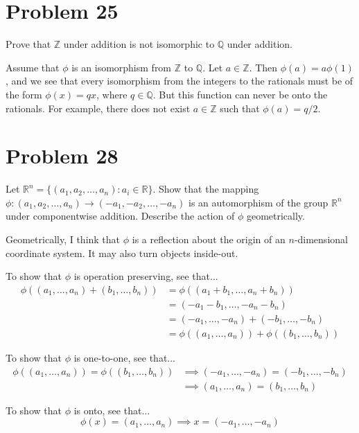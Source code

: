 \documentclass{article}
\begin{document}
\section*{Problem 25}

Prove that $\mathbb{Z}$ under addition is not isomorphic to $\mathbb{Q}$ under addition.

Assume that $\phi$ is an isomorphism from $\mathbb{Z}$ to $\mathbb{Q}$.  Let $a\in\mathbb{Z}$.
Then $\phi(a) = a\phi(1)$, and we see that every isomorphism from the integers to the rationals
must be of the form $\phi(x) = qx$, where $q\in\mathbb{Q}$.  But this function can never
be onto the rationals.  For example, there does not exist $a\in\mathbb{Z}$ such that
$\phi(a)=q/2$.

\section*{Problem 28}

Let $\mathbb{R}^n=\{(a_1,a_2,\dots,a_n):a_i\in\mathbb{R}\}$.  Show that the mapping
$\phi:(a_1,a_2,\dots,a_n)\to(-a_1,-a_2,\dots,-a_n)$ is an automorphism of the group
$\mathbb{R}^n$ under componentwise addition.  Describe the action of $\phi$ geometrically.

Geometrically, I think that $\phi$ is a reflection about the origin of an $n$-dimensional
coordinate system.  It may also turn objects inside-out.

To show that $\phi$ is operation preserving, see that...
\begin{align*}
\phi((a_1,\dots,a_n)+(b_1,\dots,b_n))
 &= \phi((a_1+b_1,\dots,a_n+b_n)) \\
 &= (-a_1-b_1,\dots,-a_n-b_n) \\
 &= (-a_1,\dots,-a_n)+(-b_1,\dots,-b_n) \\
 &= \phi((a_1,\dots,a_n))+\phi((b_1,\dots,b_n))
\end{align*}

To show that $\phi$ is one-to-one, see that...
\begin{align*}
\phi((a_1,\dots,a_n))=\phi((b_1,\dots,b_n))
 &\implies (-a_1,\dots,-a_n) = (-b_1,\dots,-b_n) \\
 &\implies (a_1,\dots,a_n) = (b_1,\dots,b_n)
\end{align*}

To show that $\phi$ is onto, see that...
\begin{equation*}
\phi(x) = (a_1,\dots,a_n) \implies x = (-a_1,\dots,-a_n)
\end{equation*}
\end{document}

